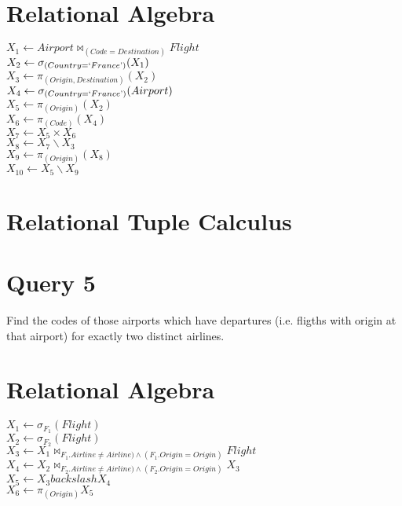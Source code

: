 \documentclass[a4paper,11pt,twoside]{article}
\begin{document}
\section{Relational Algebra}
$X_1 \leftarrow Airport \Join_ {(Code=Destination)} Flight$\\
$X_2 \leftarrow \sigma _{(Country=`France\textrm')} (X_1)$\\
$X_3 \leftarrow \pi_{(Origin, Destination)}(X_2)$\\
$X_4 \leftarrow \sigma_{(Country=`France\textrm')}(Airport)$\\
$X_5 \leftarrow \pi_{(Origin)}(X_2)$\\
$X_6 \leftarrow \pi_{(Code)}(X_4)$\\
$X_7 \leftarrow X_5 \times X_6$\\
$X_8 \leftarrow X_7 \backslash X_3$\\
$X_9 \leftarrow \pi_{(Origin)}(X_8)$\\
$X_10 \leftarrow X_5 \backslash X_9$\\

\section{Relational Tuple Calculus}

\section{Query 5}
Find the codes of those airports which have departures (i.e. fligths with origin at that airport) for exactly two distinct airlines.
\section{Relational Algebra}
$X_1 \leftarrow \sigma _{F_1}(Flight)$\\
$X_2 \leftarrow \sigma _{F_2}(Flight)$\\
$X_3 \leftarrow X_1 \Join _{F_1.Airline \neq Airline) \land (F_1.Origin=Origin)} Flight$\\
$X_4 \leftarrow X_2 \Join _{F_2.Airline \neq Airline) \land (F_2.Origin=Origin)} X_3$\\
$X_5 \leftarrow X_3 backslash X_4$\\
$X_6 \leftarrow \pi_{(Origin)} X_5$\\
\end{document}
